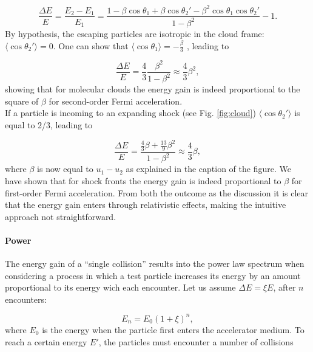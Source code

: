 \begin{equation}
\frac{\Delta E}{E} = \frac{E_2 -E_1}{E_1} = \frac{1 - 
\beta \cos \theta_1 + \beta \cos \theta_2' - \beta^2 \cos \theta_1 \cos \theta_2'}{1-\beta^2} -1.
\end{equation}
By hypothesis, the escaping particles are isotropic in the cloud frame: $\langle \cos \theta_2' \rangle = 0$. One can show that $\langle \cos \theta_1 \rangle = -\frac{\beta}{3}$ \cite{Gaisser:2016uoy}, leading to

\begin{equation}
\frac{\Delta E}{E} = \frac{4}{3} \frac{\beta^2}{1-\beta^2} \approx \frac{4}{3} \beta^2,
\end{equation}
showing that for molecular clouds the energy gain is indeed proportional to the square of $\beta$ for second-order Fermi acceleration.\\
\newline
If a particle is incoming to an expanding shock (see Fig. \ref{fig:cloud}) $\langle \cos \theta_2'\rangle$ is equal to 2/3, leading to

\begin{equation}
\frac{\Delta E}{E} = \frac{\frac{4}{3}\beta + \frac{13}{9}\beta^2}{1-\beta^2} \approx \frac{4}{3} \beta,
\end{equation}
where $\beta$ is now equal to $u_1 -u_2$ as explained in the caption of the figure. We have shown that for shock fronts the energy gain is indeed proportional to $\beta$ for first-order Fermi acceleration. From both the outcome as the discussion it is clear that the energy gain enters through relativistic effects, making the intuitive approach not straightforward.

\paragraph{Power}
\label{para:power}
The energy gain of a ``single collision'' results into the power law spectrum when considering a process in which a test particle increases its energy by an amount proportional to its energy wich each encounter. Let us assume $\Delta E = \xi E$, after $n$ encounters:

\begin{equation}
E_n = E_0 \left(1+\xi\right)^n,
\end{equation}
where $E_0$ is the energy when the particle first enters the accelerator medium. To reach a certain energy $E'$, the particles must encounter a number of collisions

